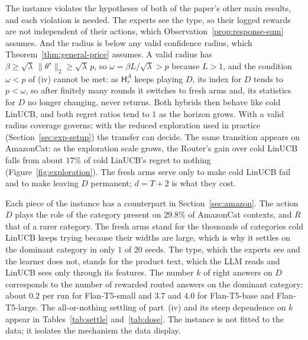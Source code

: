 \documentclass[anon]{alt2027} %
\newcommand{\Hyb}{\mathsf{H}}
\begin{document}
\begin{remark}
\label{rem:transfer-regime}
The instance violates the hypotheses of both of the paper's other main
results, and each violation is needed. The experts see the type, so their logged rewards are not
independent of their actions, which Observation~\ref{prop:response-sum}
assumes. And the radius is below any valid confidence radius, which
Theorem~\ref{thm:general-price} assumes. A valid radius has
$\beta\ge\sqrt\lambda\,\|\theta^\star\|_2\ge\sqrt\lambda\,p$, so
$\omega=\beta L/\sqrt\lambda>p$ because $L>1$, and the condition $\omega<p$ of
(iv) cannot be met: as $\Hyb^A_\tau$ keeps playing $D$, its index for $D$
tends to $p<\omega$, so after finitely many rounds it switches to fresh arms
and, its statistics for $D$ no longer changing, never returns. Both hybrids
then behave like cold LinUCB, and both regret ratios tend to $1$ as the horizon
grows. With a valid radius coverage governs; with the reduced exploration used
in practice (Section~\ref{sec:exp-setup}) the transfer can decide. The
same transition appears on AmazonCat: as the exploration scale grows, the
Router's gain over cold LinUCB falls from about $17\%$ of cold LinUCB's
regret to nothing (Figure~\ref{fig:exploration}). The fresh
arms serve only to make cold LinUCB fail and to make leaving $D$ permanent;
$d=T+2$ is what they cost.
\end{remark}

\begin{remark}
\label{rem:transfer-amazon}
Each piece of the instance has a counterpart in Section~\ref{sec:amazon}.
The action $D$ plays the role of the category present on $29.8\%$ of
AmazonCat contexts, and $R$ that of a rarer category. The fresh arms stand for
the thousands of categories cold LinUCB keeps trying because their widths
are large, which is why it settles on the dominant category in only $1$ of
$20$ seeds. The type, which the experts see and the learner does not, stands
for the product text, which the LLM reads and LinUCB sees only through its
features. The number $k$ of right answers on $D$ corresponds to the number
of rewarded routed answers on the dominant category: about $0.2$ per run for
Flan-T5-small and $3.7$ and $4.0$ for Flan-T5-base and Flan-T5-large. The
all-or-nothing settling of part~(iv) and its steep dependence on $k$ appear
in Tables~\ref{tab:settle} and~\ref{tab:dose}. The instance is not fitted to
the data; it isolates the mechanism the data display.
\end{remark}
\end{document}
